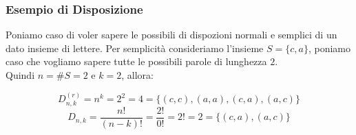 \subsubsection{Esempio di Disposizione}
Poniamo caso di voler sapere le possibili di dispozioni normali e semplici di un dato insieme di lettere.
Per semplicità consideriamo l'insieme $S=\{c,a\}$, poniamo caso che vogliamo sapere tutte le possibili parole di lunghezza $2$.\\
Quindi $n = \#S = 2$ e $k = 2$, allora:

$$ D^{(r)}_{n,k} = n^k = 2^2 = 4 = \{(c,c),(a,a),(c,a),(a,c)\} $$
$$ D_{n,k} = \frac{n!}{(n-k)!} = \frac{2!}{0!} = 2! = 2 = \{(c,a), (a,c)\}$$ 


















